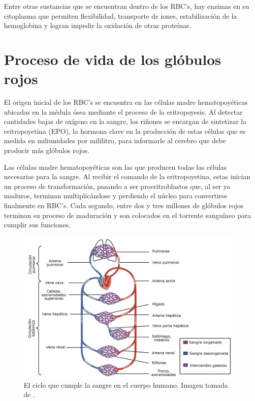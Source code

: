 Entre otras sustancias que se encuentran dentro de los RBC's, hay enzimas en su citoplasma que permiten flexibilidad, transporte de iones, estabilización de la hemoglobina y logran impedir la oxidación de otras proteínas.

\section{Proceso de vida de los glóbulos rojos}\label{sec:RBC:vida}

El origen inicial de los RBC's se encuentra en las células madre hematopoyéticas ubicadas en la médula ósea mediante el proceso de la eritropoyesis. Al detectar cantidades bajas de oxígeno en la sangre, los riñones se encargan de sintetizar la eritropoyetina (EPO), la hormona clave en la producción de estas células que es medida en miliunidades por mililitro, para informarle al cerebro que debe producir más glóbulos rojos. 

Las células madre hematopoyéticas son las que producen todas las células necesarias para la sangre. Al recibir el comando de la eritropoyetina, estas inician un proceso de transformación, pasando a ser proeritroblastos que, al ser ya maduros, terminan multiplicándose y perdiendo el núcleo para convertirse finalmente en RBC's. Cada segundo, entre dos y tres millones de glóbulos rojos terminan su proceso de maduración y son colocados en el torrente sanguíneo para cumplir sus funciones.

\begin{figure}[H]
    \centering
    \includegraphics[scale=0.2]{figures/CicloSangre.jpg}
    \caption{El ciclo que cumple la sangre en el cuerpo humano. Imagen tomada de \cite{eswiki:159489943}.}
    \label{sec:RBC:fig:CicloSangre}
\end{figure}

